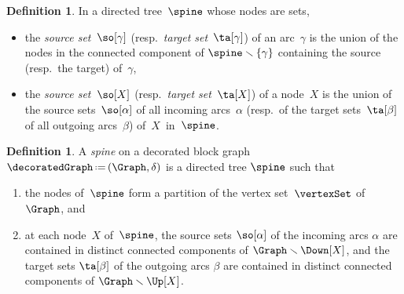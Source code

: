 \documentclass{amsart}
\theoremstyle{definition}
\newtheorem{definition}[theorem]{Definition}
\newcommand{\ssm}{\smallsetminus} %
\newcommand{\eqdef}{\mbox{\,\raisebox{0.2ex}{\scriptsize\ensuremath{\mathrm:}}\ensuremath{=}\,}} %
\newcommand{\darkblue}{\color{darkblue}} %
\newcommand{\defn}[1]{\textsl{\darkblue #1}} %
\newcommand{\decoration}{\delta}
\begin{document}
\begin{definition}
  \label{def:sourceTargetSets}
  In a directed tree~$\spine$ whose nodes are sets,
  \begin{itemize}
    \item the \defn{source set}~$\so[\gamma]$ (resp.~\defn{target set}~$\ta[\gamma]$) of an arc~$\gamma$ is the union of the nodes in the connected component of $\spine \ssm \{\gamma\}$ containing the source (resp.~the target) of~$\gamma$,
    \item the \defn{source set}~$\so[X]$ (resp.~\defn{target set}~$\ta[X]$) of a node~$X$ is the union of the source sets~$\so[\alpha]$ of all incoming arcs~$\alpha$ (resp.~of the target sets~$\ta[\beta]$ of all outgoing arcs~$\beta$) of~$X$~in~$\spine$.
  \end{itemize}
\end{definition}

\begin{definition}
  \label{def:spine}
  A \defn{spine} on a decorated block graph $\decoratedGraph \eqdef (\Graph,\decoration)$ is a directed tree $\spine$ such that
  \begin{enumerate}
    \item the nodes of~$\spine$ form a partition of the vertex set~$\vertexSet$ of~$\Graph$, and 
    \item at each node~$X$ of~$\spine$, the source sets $\so[\alpha]$ of the incoming arcs $\alpha$ are contained in distinct connected components of $\Graph \ssm \Down[X]$, and the target sets $\ta[\beta]$ of the outgoing arcs $\beta$ are contained in distinct connected components of $\Graph \ssm \Up[X]$.
  \end{enumerate}
\end{definition}
\end{document}
